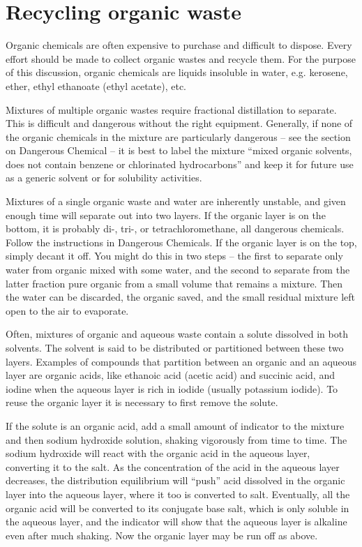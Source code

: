 \chapter{Recycling organic waste}

Organic chemicals are often expensive 
to purchase and difficult to dispose. 
Every effort should be made to collect organic wastes and recycle them. 
For the purpose of this discussion, 
organic chemicals are liquids insoluble in water, 
e.g. 
kerosene, 
ether, 
ethyl ethanoate (ethyl acetate), 
etc.

Mixtures of multiple organic wastes 
require fractional distillation to separate. 
This is difficult and dangerous without the right equipment. 
Generally, 
if none of the organic chemicals in the mixture are particularly dangerous – 
see the section on Dangerous Chemical – 
it is best to label the mixture “mixed organic solvents, 
does not contain benzene or chlorinated hydrocarbons” 
and keep it for future use as a generic solvent or for solubility activities.

Mixtures of a single organic waste and water are inherently unstable, 
and given enough time will separate out into two layers. 
If the organic layer is on the bottom, 
it is probably di-, 
tri-, 
or tetrachloromethane, 
all dangerous chemicals. 
Follow the instructions in Dangerous Chemicals. 
If the organic layer is on the top, 
simply decant it off. 
You might do this in two steps – 
the first to separate only water from organic mixed with some water, 
and the second to separate from the latter fraction pure organic 
from a small volume that remains a mixture. 
Then the water can be discarded, 
the organic saved, 
and the small residual mixture left open to the air to evaporate.

Often, 
mixtures of organic and aqueous waste 
contain a solute dissolved in both solvents. 
The solvent is said to be distributed 
or partitioned between these two layers. 
Examples of compounds that partition between an organic 
and an aqueous layer are organic acids, 
like ethanoic acid (acetic acid) and succinic acid, 
and iodine when the aqueous layer is rich in iodide 
(usually potassium iodide). 
To reuse the organic layer it is necessary to first remove the solute.

If the solute is an organic acid, 
add a small amount of indicator to the mixture 
and then sodium hydroxide solution, 
shaking vigorously from time to time. 
The sodium hydroxide will react with the organic acid 
in the aqueous layer, 
converting it to the salt. 
As the concentration of the acid in the aqueous layer decreases, 
the distribution equilibrium will ``push'' acid dissolved 
in the organic layer into the aqueous layer, 
where it too is converted to salt. 
Eventually, 
all the organic acid will be converted to its conjugate base salt, 
which is only soluble in the aqueous layer, 
and the indicator will show that the aqueous layer 
is alkaline even after much shaking. 
Now the organic layer may be run off as above.

